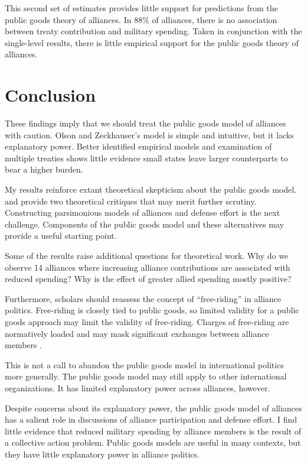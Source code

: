 \documentclass[12pt]{article}
\begin{document}


This second set of estimates provides little support for predictions from the public goods theory of alliances. 
In 88\% of alliances, there is no association between treaty contribution and military spending. 
Taken in conjunction with the single-level results, there is little empirical support for the public goods theory of alliances.


\section{Conclusion}


These findings imply that we should treat the public goods model of alliances with caution. 
Olson and Zeckhauser's model is simple and intuitive, but it lacks explanatory power. 
Better identified empirical models and examination of multiple treaties shows little evidence small states leave larger counterparts to bear a higher burden. 


My results reinforce extant theoretical skepticism about the public goods model. 
\citet{Palmer1990} and \citet{SandlerHartley2001} provide two theoretical critiques that may merit further scrutiny. 
Constructing parsimonious models of alliances and defense effort is the next challenge. 
Components of the public goods model and these alternatives may provide a useful starting point. 


Some of the results raise additional questions for theoretical work. 
Why do we observe 14 alliances where increasing alliance contributions are associated with reduced spending?
Why is the effect of greater allied spending mostly positive? 


Furthermore, scholars should reassess the concept of ``free-riding'' in alliance politics. 
Free-riding is closely tied to public goods, so limited validity for a public goods approach may limit the validity of free-riding. 
Charges of free-riding are normatively loaded and may mask significant exchanges between alliance members \citep{Lanoszka2015}. 


This is not a call to abandon the public goods model in international politics more generally. 
The public goods model may still apply to other international organizations. 
It has limited explanatory power across alliances, however. 


Despite concerns about its explanatory power, the public goods model of alliances has a salient role in discussions of alliance participation and defense effort. 
I find little evidence that reduced military spending by alliance members is the result of a collective action problem. 
Public goods models are useful in many contexts, but they have little explanatory power in alliance politics. 


\singlespace


%  
 
\end{document}

